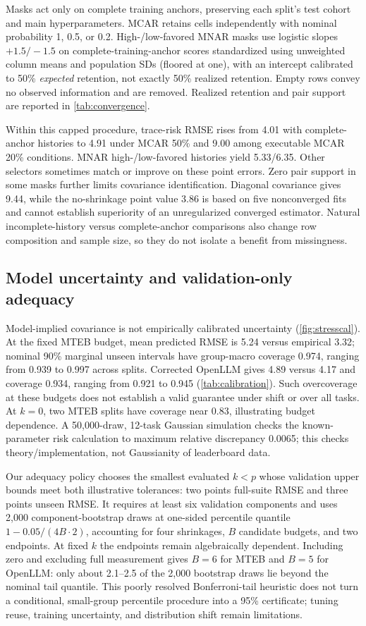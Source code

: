 \documentclass{article}
\begin{document}
Masks act only on complete training anchors, preserving each split's test cohort and main hyperparameters. MCAR retains cells independently with nominal probability 1, 0.5, or 0.2. High-/low-favored MNAR masks use logistic slopes $+1.5/-1.5$ on complete-training-anchor scores standardized using unweighted column means and population SDs (floored at one), with an intercept calibrated to 50\% \emph{expected} retention, not exactly 50\% realized retention. Empty rows convey no observed information and are removed. Realized retention and pair support are reported in \cref{tab:convergence}.

Within this capped procedure, trace-risk RMSE rises from 4.01 with complete-anchor histories to 4.91 under MCAR 50\% and 9.00 among executable MCAR 20\% conditions. MNAR high-/low-favored histories yield 5.33/6.35. Other selectors sometimes match or improve on these point errors. Zero pair support in some masks further limits covariance identification. Diagonal covariance gives 9.44, while the no-shrinkage point value 3.86 is based on five nonconverged fits and cannot establish superiority of an unregularized converged estimator. Natural incomplete-history versus complete-anchor comparisons also change row composition and sample size, so they do not isolate a benefit from missingness.

\subsection{Model uncertainty and validation-only adequacy}
\label{sec:adequacy}
Model-implied covariance is not empirically calibrated uncertainty (\cref{fig:stresscal}). At the fixed MTEB budget, mean predicted RMSE is 5.24 versus empirical 3.32; nominal 90\% marginal unseen intervals have group-macro coverage 0.974, ranging from 0.939 to 0.997 across splits. Corrected OpenLLM gives 4.89 versus 4.17 and coverage 0.934, ranging from 0.921 to 0.945 (\cref{tab:calibration}). Such overcoverage at these budgets does not establish a valid guarantee under shift or over all tasks. At $k=0$, two MTEB splits have coverage near 0.83, illustrating budget dependence. A 50,000-draw, 12-task Gaussian simulation checks the known-parameter risk calculation to maximum relative discrepancy 0.0065; this checks theory/implementation, not Gaussianity of leaderboard data.

Our adequacy policy chooses the smallest evaluated $k<p$ whose validation upper bounds meet both illustrative tolerances: two points full-suite RMSE and three points unseen RMSE. It requires at least six validation components and uses 2,000 component-bootstrap draws at one-sided percentile quantile $1-0.05/(4B\cdot2)$, accounting for four shrinkages, $B$ candidate budgets, and two endpoints. At fixed $k$ the endpoints remain algebraically dependent. Including zero and excluding full measurement gives $B=6$ for MTEB and $B=5$ for OpenLLM: only about 2.1--2.5 of the 2,000 bootstrap draws lie beyond the nominal tail quantile. This poorly resolved Bonferroni-tail heuristic does not turn a conditional, small-group percentile procedure into a 95\% certificate; tuning reuse, training uncertainty, and distribution shift remain limitations.
\end{document}
